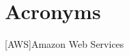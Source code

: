 \documentclass[12pt,a4paper]{book}
\begin{document}
	



\newpage
\thispagestyle{empty}
\mbox{}


\setcounter{secnumdepth}{4}
\setcounter{tocdepth}{3} 







\tableofcontents




%

%

%




\appendix





\backmatter

\listoftables
\listoffigures

\chapter{Acronyms}
\begin{acronym}[AWS]
 [AWS]{Amazon Web Services}
\end{acronym}
\printglossaries
\label{cha:bibliography}
\nocite{*}
\printbibliography
\end{document}
